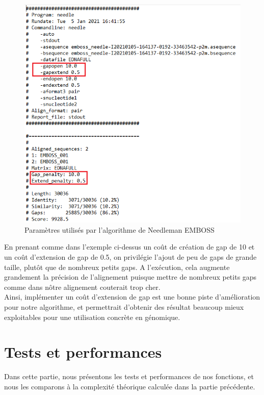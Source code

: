 \documentclass[12pt]{article}
\begin{document}
\begin{figure}[!h]
    \centering
    \includegraphics[scale = 0.8]{Images/Needleman/param.png}
    \caption{Paramètres utilisés par l'algorithme de Needleman EMBOSS}
\end{figure}

\newpage

En prenant comme dans l'exemple ci-dessus un coût de création de gap de 10 et un coût d'extension de gap de 0.5, on privilégie l'ajout de peu de gaps de grande taille, plutôt que de nombreux petits gaps. A l'exécution, cela augmente grandement la précision de l'alignement puisque mettre de nombreux petits gaps comme dans nôtre alignement couterait trop cher.\\

Ainsi, implémenter un coût d'extension de gap est une bonne piste d'amélioration pour notre algorithme, et permettrait d'obtenir des résultat beaucoup mieux exploitables pour une utilisation concrète en génomique.

\newpage

\section{Tests et performances}
Dans cette partie, nous présentons les tests et performances de nos fonctions, et nous les comparons à la complexité théorique calculée dans la partie précédente.
\end{document}

